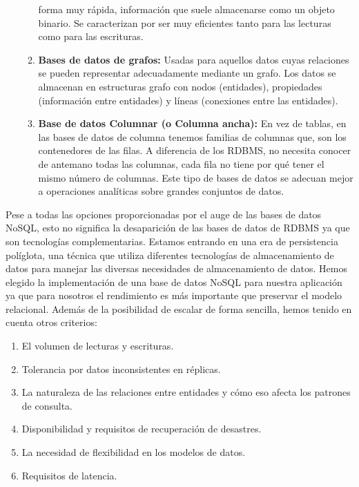 \begin{enumerate}
\begin{enumerate}
 forma muy rápida, información que suele almacenarse como un objeto
 binario. Se caracterizan por ser muy eficientes tanto para las lecturas
 como para las escrituras. 
\item \textbf{Bases de datos de grafos:} Usadas para aquellos datos 
cuyas relaciones se pueden representar adecuadamente mediante 
un grafo. Los datos se almacenan en estructuras grafo con nodos 
(entidades), propiedades (información entre entidades) y líneas (conexiones
 entre las entidades). 
\item \textbf{Base de datos Columnar (o Columna ancha):} En vez de
 tablas, en las bases de datos de columna tenemos familias de columnas
 que, son los contenedores de las filas. A diferencia de los RDBMS, 
no necesita conocer de antemano todas las columnas, cada fila no tiene 
por qué tener el mismo número de columnas. Este tipo de bases de datos
 se adecuan mejor a operaciones analíticas sobre grandes conjuntos de datos.
\end{enumerate}

\end{enumerate}
Pese a todas las opciones proporcionadas por el auge de las bases
 de datos NoSQL, esto no significa la desaparición de las bases de 
datos de RDBMS ya que son tecnologías complementarias. Estamos
 entrando en una era de persistencia políglota, una técnica que utiliza 
diferentes tecnologías de almacenamiento de datos para manejar las 
diversas necesidades de almacenamiento de datos. Hemos elegido la 
implementación de una base de datos NoSQL para nuestra aplicación
 ya que para nosotros el rendimiento es más importante que preservar 
el modelo relacional. Además de la posibilidad de escalar de forma sencilla, 
hemos tenido en cuenta otros criterios: 
\begin{enumerate}
\item El volumen de lecturas y escrituras.
\item Tolerancia por datos inconsistentes en réplicas.
\item La naturaleza de las relaciones entre entidades y cómo eso afecta
 los patrones de consulta.
\item Disponibilidad y requisitos de recuperación de desastres.
\item La necesidad de flexibilidad en los modelos de datos.
\item Requisitos de latencia.
\end{enumerate}
